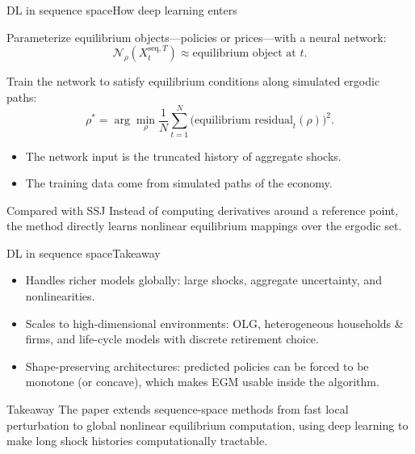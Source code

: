 \documentclass[aspectratio=169]{beamer}
\begin{document}
\begin{frame}{DL in sequence space}{How deep learning enters}
\small

Parameterize equilibrium objects---policies or prices---with a neural network:
\[
\mathcal N_\rho(X_t^{\text{seq},T}) \approx \text{equilibrium object at } t.
\]

Train the network to satisfy equilibrium conditions along simulated ergodic paths:
\[
\rho^*
=
\arg\min_\rho
\frac{1}{N}\sum_{t=1}^N
\big(\text{equilibrium residual}_t(\rho)\big)^2 .
\]

\begin{itemize}
    \item The network input is the truncated history of aggregate shocks.
    \item The training data come from simulated paths of the economy.
\end{itemize}

\begin{alertblock}{Compared with SSJ}
Instead of computing \alert{derivatives} around a reference point, the method directly learns
\alert{nonlinear equilibrium mappings} over the ergodic set.
\end{alertblock}

\end{frame}

\begin{frame}{DL in sequence space}{Takeaway \cite{azinovic2025deep}}
\small

\begin{itemize}
    \item \alert{Handles richer models globally}: large shocks, aggregate uncertainty, and nonlinearities.
    \item \alert{Scales to high-dimensional environments}: OLG, heterogeneous households \& firms,
    and life-cycle models with discrete retirement choice.
    \item \alert{Shape-preserving architectures}: predicted policies can be forced to be monotone
    (or concave), which makes EGM usable inside the algorithm.
\end{itemize}

\begin{alertblock}{Takeaway}
The paper extends sequence-space methods from \alert{fast local perturbation} to
\alert{global nonlinear equilibrium computation}, using deep learning to make long shock histories
computationally tractable.
\end{alertblock}

\end{frame}
\end{document}
